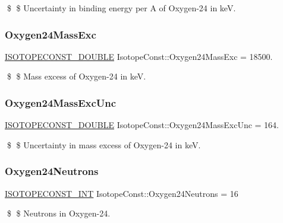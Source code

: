 \$ \$ Uncertainty in binding energy per A of Oxygen-\/24 in keV. \mbox{\label{group___isotope_const-_oxygen-_o24_ga52ddd9d96aecd97f48f5c93e5c426bd7}} 
\subsubsection{\texorpdfstring{Oxygen24\+Mass\+Exc}{Oxygen24MassExc}}
{\footnotesize\ttfamily \mbox{\hyperlink{group___isotope_const-_macros_ga8f45a7272ce02c0b4c65c44636ed719a}{I\+S\+O\+T\+O\+P\+E\+C\+O\+N\+S\+T\+\_\+\+D\+O\+U\+B\+LE}} Isotope\+Const\+::\+Oxygen24\+Mass\+Exc = 18500.}

\$ \$ Mass excess of Oxygen-\/24 in keV. \mbox{\label{group___isotope_const-_oxygen-_o24_gaf3b5d540ee1d351b735d79c71ab4c789}} 
\subsubsection{\texorpdfstring{Oxygen24\+Mass\+Exc\+Unc}{Oxygen24MassExcUnc}}
{\footnotesize\ttfamily \mbox{\hyperlink{group___isotope_const-_macros_ga8f45a7272ce02c0b4c65c44636ed719a}{I\+S\+O\+T\+O\+P\+E\+C\+O\+N\+S\+T\+\_\+\+D\+O\+U\+B\+LE}} Isotope\+Const\+::\+Oxygen24\+Mass\+Exc\+Unc = 164.}

\$ \$ Uncertainty in mass excess of Oxygen-\/24 in keV. \mbox{\label{group___isotope_const-_oxygen-_o24_ga526d7d71d47e2607deeae95f35150f1f}} 
\subsubsection{\texorpdfstring{Oxygen24\+Neutrons}{Oxygen24Neutrons}}
{\footnotesize\ttfamily \mbox{\hyperlink{group___isotope_const-_macros_ga5f18360b3e99483a35c32d789e62621c}{I\+S\+O\+T\+O\+P\+E\+C\+O\+N\+S\+T\+\_\+\+I\+NT}} Isotope\+Const\+::\+Oxygen24\+Neutrons = 16}

\$ \$ Neutrons in Oxygen-\/24. \mbox{\label{group___isotope_const-_oxygen-_o24_ga8729ac8ef2d9df58b4a04ae450ede157}} 
